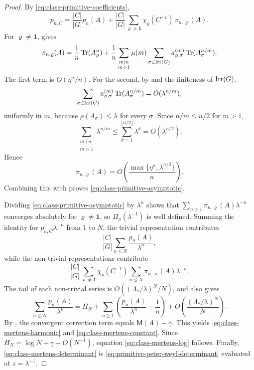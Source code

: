 \begin{proof}
  By \eqref{eq:class-primitive-coefficients},
  \[
    p_{n,C}
    =
    \frac{|C|}{|G|}p_n(A)
    +\frac{|C|}{|G|}
      \sum_{\varrho\neq\mathbf 1}
        \chi_\varrho(C^{-1})\,\pi_{n,\varrho}(A).
  \]
  For \(\varrho\neq\mathbf 1\), 
  gives
  \[
    \pi_{n,\varrho}(A)
    =
    \frac{1}{n}\operatorname{Tr}(A_\varrho^n)
    +\frac{1}{n}
      \sum_{\substack{m\mid n\\ m>1}}\mu(m)
        \sum_{\sigma\in\operatorname{Irr}(G)}
          a_{\varrho,\sigma}^{(m)}\operatorname{Tr}(A_\sigma^{n/m}).
  \]
  The first term is \(O(\eta^n/n)\). For the second, by
   and the finiteness of
  \(\operatorname{Irr}(G)\),
  \[
    \sum_{\sigma\in\operatorname{Irr}(G)}
      a_{\varrho,\sigma}^{(m)}\operatorname{Tr}(A_\sigma^{n/m})
    =O(\lambda^{n/m}),
  \]
  uniformly in \(m\), because \(\rho(A_\sigma)\le \lambda\) for every
  \(\sigma\). Since \(n/m\le n/2\) for \(m>1\),
  \[
    \sum_{\substack{m\mid n\\ m>1}}\lambda^{n/m}
    \le \sum_{k=1}^{\lfloor n/2\rfloor}\lambda^k
    =O(\lambda^{n/2}).
  \]
  Hence
  \[
    \pi_{n,\varrho}(A)
    =O\!\left(\frac{\max\{\eta^n,\lambda^{n/2}\}}{n}\right).
  \]
  Combining this with  proves
  \eqref{eq:class-primitive-asymptotic}.

  Dividing \eqref{eq:class-primitive-asymptotic} by \(\lambda^n\) shows
  that \(\sum_{n\ge 1}\pi_{n,\varrho}(A)\lambda^{-n}\) converges
  absolutely for \(\varrho\neq\mathbf 1\), so
  \(\Pi_\varrho(\lambda^{-1})\) is well defined. Summing the identity
  for \(p_{n,C}\lambda^{-n}\) from \(1\) to \(N\), the trivial
  representation contributes
  \[
    \frac{|C|}{|G|}
      \sum_{n\le N}\frac{p_n(A)}{\lambda^n},
  \]
  while the non-trivial representations contribute
  \[
    \frac{|C|}{|G|}
      \sum_{\varrho\neq\mathbf 1}\chi_\varrho(C^{-1})
      \sum_{n\le N}\pi_{n,\varrho}(A)\lambda^{-n}.
  \]
  The tail of each non-trivial series is
  \(O((\Lambda_*/\lambda)^N/N)\), and
   also gives
  \[
    \sum_{n\le N}\frac{p_n(A)}{\lambda^n}
    =
    H_N+\sum_{n\ge 1}\left(\frac{p_n(A)}{\lambda^n}-\frac{1}{n}\right)
    +O\!\left(\frac{(\Lambda_*/\lambda)^N}{N}\right).
  \]
  By , the convergent
  correction term equals \(\mathsf M(A)-\gamma\). This yields
  \eqref{eq:class-mertens-harmonic} and
  \eqref{eq:class-mertens-constant}. Since
  \(H_N=\log N+\gamma+O(N^{-1})\), equation
  \eqref{eq:class-mertens-log} follows. Finally,
  \eqref{eq:class-mertens-determinant} is
  \eqref{eq:primitive-peter-weyl-determinant} evaluated at
  \(z=\lambda^{-1}\).
\end{proof}

